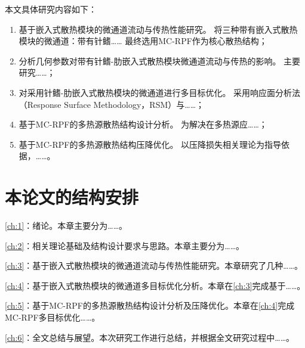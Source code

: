 \noindent 本文具体研究内容如下：

\begin{enumerate}[label =(\arabic*)]

    \item 基于嵌入式散热模块的微通道流动与传热性能研究。
          将三种带有嵌入式散热模块的微通道：带有针鳍……
          最终选用MC-RPF作为核心散热结构；
    \item 分析几何参数对带有针鳍-肋嵌入式散热模块微通道流动与传热的影响。
          主要研究……；
    \item 对采用针鳍-肋嵌入式散热模块的微通道进行多目标优化。
          采用响应面分析法（Response Surface Methodology，RSM）与……；
    \item 基于MC-RPF的多热源散热结构设计分析。
          为解决在多热源应……；
    \item 基于MC-RPF的多热源散热结构压降优化。
          以压降损失相关理论为指导依据，……。

\end{enumerate}

\section{本论文的结构安排}
\cref{ch:1}：绪论。本章主要分为……。

\cref{ch:2}：相关理论基础及结构设计要求与思路。本章主要分为……。

\cref{ch:3}：基于嵌入式散热模块的微通道流动与传热性能研究。本章研究了几种……。

\cref{ch:4}：基于嵌入式散热模块的微通道多目标优化分析。本章在\cref{ch:3}完成基于……。

\cref{ch:5}：基于MC-RPF的多热源散热结构设计分析及压降优化。本章在\cref{ch:4}完成MC-RPF多目标优化……。

\cref{ch:6}：全文总结与展望。本次研究工作进行总结，并根据全文研究过程中……。


